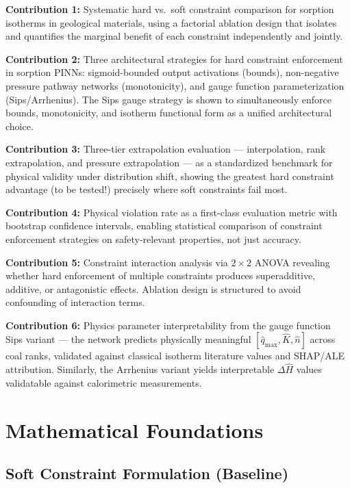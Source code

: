 \documentclass[12pt,a4paper]{article}
\begin{document}
\begin{novelbox}
\textbf{Contribution 1:} Systematic hard vs.\ soft constraint
comparison for sorption isotherms in geological materials, using a
factorial ablation design that isolates and quantifies the
marginal benefit of each constraint independently and jointly.

\textbf{Contribution 2:} Three architectural strategies for
hard constraint enforcement in sorption PINNs: sigmoid-bounded
output activations (bounds), non-negative pressure pathway networks
(monotonicity), and gauge function parameterization (Sips/Arrhenius).
The Sips gauge strategy is shown to simultaneously enforce bounds,
monotonicity, and isotherm functional form as a unified architectural
choice.

\textbf{Contribution 3:} Three-tier extrapolation evaluation ---
interpolation, rank extrapolation, and pressure extrapolation ---
as a standardized benchmark for physical validity under distribution
shift, showing the greatest hard constraint advantage (to be tested!)
precisely where soft constraints fail most.

\textbf{Contribution 4:} Physical violation rate as a first-class
evaluation metric with bootstrap confidence intervals, enabling
statistical comparison of constraint enforcement strategies on
safety-relevant properties, not just accuracy.

\textbf{Contribution 5:} Constraint interaction analysis via $2\times2$
ANOVA revealing whether hard enforcement of multiple constraints
produces superadditive, additive, or antagonistic effects. Ablation
design is structured to avoid confounding of interaction terms.

\textbf{Contribution 6:} Physics parameter interpretability from the
gauge function Sips variant --- the network predicts physically
meaningful $[\hat{q}_{\max}, \hat{K}, \hat{n}]$ across coal ranks,
validated against classical isotherm literature values and SHAP/ALE
attribution. Similarly, the Arrhenius variant yields interpretable
$\Delta\hat{H}$ values validatable against calorimetric measurements.
\end{novelbox}

\section{Mathematical Foundations}

\subsection{Soft Constraint Formulation (Baseline)}
\end{document}
